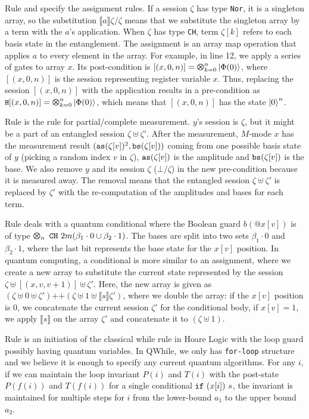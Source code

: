 Rule  and  specify the assignment rules.
If a session $\zeta$ has type \texttt{Nor}, it is a singleton array,
so the substitution $\llbracket a \rrbracket \zeta /\zeta$ means
that we substitute the singleton array by a term with the $a$'s application.
When $\zeta$ has type \texttt{CH}, term $\zeta[k]$ refers to each basis state in the entanglement.
The assignment is an array map operation that applies $a$ to every element in the array.
For example, in  line 12,
we apply a series of  gates to array $x$.
Its post-condition is $[(x,0,n)]=\Motimes_{k=0}^{n}\ket{\Phi(0)}$,
where $[(x,0,n)]$ is the session representing register variable $x$.
Thus, replacing the session $[(x,0,n)]$ with the  application
results in a pre-condition as $\code{H}[(x,0,n)]=\Motimes_{k=0}^{n}\ket{\Phi(0)}$,
which means that $[(x,0,n)]$ has the state $\left\vert{0}\right\rangle^n$.

Rule  is the rule for partial/complete measurement.
$y$'s session is $\zeta$, but it might be a part of an entangled session $\zeta\uplus\zeta'$.
After the measurement, $M$-mode $x$ has the measurement result $(\texttt{as}(\zeta[v])^2,\texttt{bs}(\zeta[v]))$ coming
from one possible basis state of $y$ (picking a random index $v$ in $\zeta$), 
$\texttt{as}(\zeta[v])$ is the amplitude and $\texttt{bs}(\zeta[v])$ is the base.
We also remove $y$ and its session $\zeta$ ($\bot/\zeta$) in the new pre-condition because it is measured away.
The removal means that the entangled session $\zeta\uplus\zeta'$ is replaced by $\zeta'$ 
with the re-computation of the amplitudes and bases for each term.

Rule  deals with a quantum conditional where the Boolean guard $b(@x[v])$ is of type $\ttype{n}{\tch{2m}{(\beta_1\cdot 0 \cup \beta_2\cdot 1)}}$. The bases are split into two sets $\beta_1\cdot 0$ and $\beta_2\cdot 1$, where the last bit represents the base state for the $x[v]$ position.
In quantum computing, a conditional is more similar to an assignment, where we create a new array to substitute 
the current state represented by the session $\zeta\uplus[(x,v,v+1)]\uplus\zeta'$.
Here, the new array is given as $(\zeta\uplus 0 \uplus \zeta')\texttt{++}(\zeta\uplus 1 \uplus \llbracket s \rrbracket\zeta')$,
where we double the array: if the $x[v]$ position is $0$, we concatenate the current session $\zeta'$ for the conditional body,
if $x[v]=1$, we apply $\llbracket s \rrbracket$ on the array $\zeta'$ and concatenate it to $(\zeta\uplus 1)$.

Rule  is an initiation of the classical while rule in Hoare Logic with the loop guard possibly having quantum variables.
In QWhile, we only has \texttt{for-loop} structure and we believe it is enough to specify any current quantum algorithms.
For any $i$, if we can maintain the loop invariant $P(i)$ and $T(i)$ with the post-state $P(f(i))$ and $T(f(i))$
for a single conditional $\texttt{if}~{(x[i])}~{s}$, the invariant is maintained for multiple steps
for $i$ from the lower-bound $a_1$ to the upper bound $a_2$.

